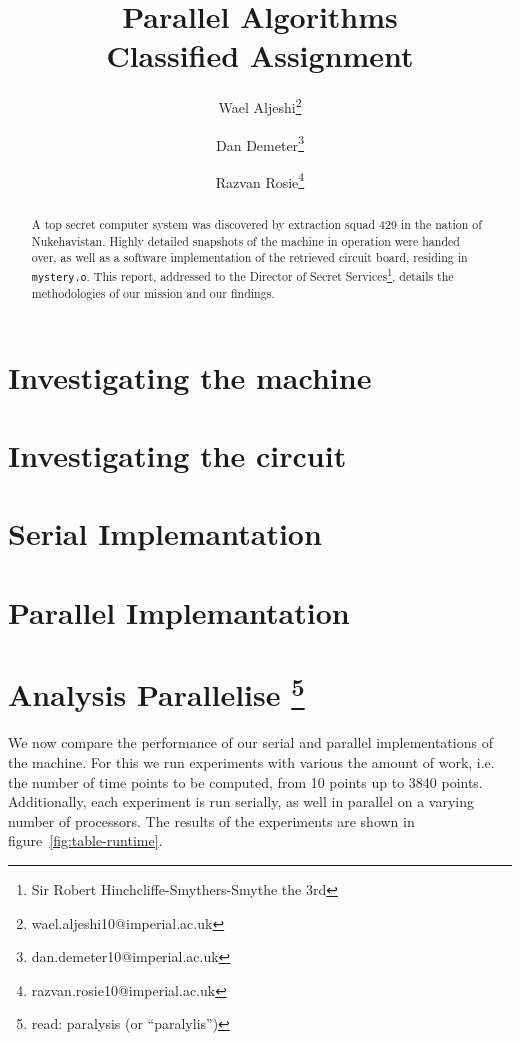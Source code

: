 \documentclass[11pt,twocolumn]{article} %
\title{Parallel Algorithms \\ Classified Assignment}
\author{Wael Aljeshi\thanks{wael.aljeshi10@imperial.ac.uk}}
\author{Dan Demeter\thanks{dan.demeter10@imperial.ac.uk}}
\author{Razvan Rosie\thanks{razvan.rosie10@imperial.ac.uk}}
\affil{Department of Computing, Imperial College London}
\begin{document}
\maketitle

\renewcommand{\abstractname}{Mission Brief}

\begin{abstract}
A top secret computer system was discovered by extraction squad 429 in the nation of Nukehavistan. Highly detailed snapshots of the machine in operation were handed over, as well as a software implementation of the retrieved circuit board, residing in \texttt{mystery.o}. This report, addressed to the Director of Secret Services\footnote{Sir Robert Hinchcliffe-Smythers-Smythe the 3rd}, details the methodologies of our mission and our findings.
\end{abstract}



\section{Investigating the machine}


\section{Investigating the circuit}


\section{Serial Implemantation}


\section{Parallel Implemantation}


\section[Analysis Parallelise]{Analysis Parallelise \footnote{read: paralysis (or ``paralylis'')} }

We now compare the performance of our serial and parallel implementations of the machine. For this we run experiments with various the amount of work, i.e. the number of time points to be computed, from 10 points up to 3840 points. Additionally, each experiment is run serially, as well in parallel on a varying number of processors. The results of the experiments are shown in figure~\ref{fig:table-runtime}.
\end{document}
